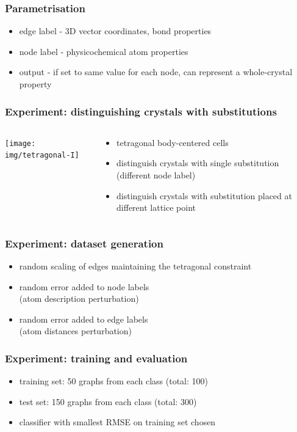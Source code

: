 \documentclass{beamer}
\begin{document}
\begin{frame}
\frametitle{Parametrisation}
\begin{itemize}
	\item edge label - 3D vector coordinates, bond properties
	\item node label - physicochemical atom properties
	\item output - if set to same value for each node, can represent a whole-crystal property
\end{itemize}
\end{frame}

\begin{frame}
\frametitle{Experiment: distinguishing crystals with substitutions}
\begin{columns}
	\begin{column}{0.34\textwidth}
		\texttt{[image: img/tetragonal-I]}
	\end{column}
	\begin{column}{0.66\textwidth}
		\begin{itemize}
			\item tetragonal body-centered cells
			\item distinguish crystals with single substitution (different node label)
			\item distinguish crystals with substitution placed at different lattice point
		\end{itemize}
	\end{column}
\end{columns}

\end{frame}

\begin{frame}
\frametitle{Experiment: dataset generation}
\begin{itemize}
	\item random scaling of edges maintaining the tetragonal constraint
	\item random error added to node labels\\(atom description perturbation)
	\item random error added to edge labels\\(atom distances perturbation)
\end{itemize}
\end{frame}

\begin{frame}
\frametitle{Experiment: training and evaluation}
\begin{itemize}
	\item training set: 50 graphs from each class (total: 100)
	\item test set: 150 graphs from each class (total: 300)
	\item classifier with smallest RMSE on training set chosen
\end{itemize}
\end{frame}
\end{document}
